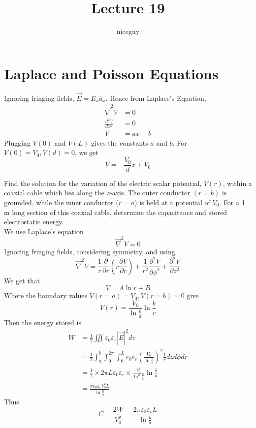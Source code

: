 \documentclass[12pt]{article}
\author{niceguy}
\title{Lecture 19}
\begin{document}
\maketitle

\section{Laplace and Poisson Equations}

\begin{ex}
	Ignoring fringing fields, $\vec{E} = E_x\hat{a}_x$. Hence from Laplace's Equation,
	\begin{align*}
		\vec{\nabla}^2V &= 0 \\
		\frac{d^2V}{dx^2} &= 0 \\
		V &= ax + b
	\end{align*}
	Plugging $V(0)$ and $V(L)$ gives the constants $a$ and $b$. For $V(0) = V_0, V(d) = 0$, we get
	$$V = -\frac{V_0}{d}x + V_0$$
\end{ex}

\begin{ex}
	Find the solution for the variation of the electric scalar potential, $V(r)$, within a coaxial cable which lies along the $z$-axis. The outer conductor $(r=b)$ is grounded, while the inner conductor ($r=a$) is held at a potential of $V_0$. For a 1 m long section of this coaxial cable, determine the capacitance and stored electrostatic energy. \\
	We use Laplace's equation
	$$\vec{\nabla}^2V = 0$$
	Ignoring fringing fields, considering symmetry, and using
	$$\vec{\nabla}^2V = \frac{1}{r}\frac{\partial}{\partial r}\left(r \frac{\partial V}{\partial r}\right) + \frac{1}{r^2}\frac{\partial^2V}{\partial\phi^2} + \frac{\partial^2V}{\partial z^2}$$
	We get that
	$$V = A\ln r + B$$
	Where the boundary values $V(r=a) = V_0, V(r=b) = 0$ give
	$$V(r) = \frac{V_0}{\ln\frac{b}{a}}\ln\frac{b}{r}$$
	Then the energy stored is
	\begin{align*}
		W &= \frac{1}{2} \iiint \varepsilon_0 \varepsilon_r |\vec{E}|^2dv \\
		  &= \frac{1}{2} \int_a^b \int_0^{2\pi} \int_0^L \varepsilon_0\varepsilon_r \left(\frac{V_0}{\ln\frac{b}{a}}\right)^2 \frac{1}{r} dzd\phi dr \\
		  &= \frac{1}{2} \times 2\pi L\varepsilon_0 \varepsilon_r \times \frac{V_0^2}{\ln^2 \frac{b}{a}} \ln\frac{b}{a} \\
		  &= \frac{\pi\varepsilon_0 \varepsilon_r V_0^2L}{\ln\frac{b}{a}}
	\end{align*}
	Thus
	$$C = \frac{2W}{V_0^2} = \frac{2\pi\varepsilon_0 \varepsilon_r L}{\ln\frac{b}{a}}$$
\end{ex}
\end{document}
